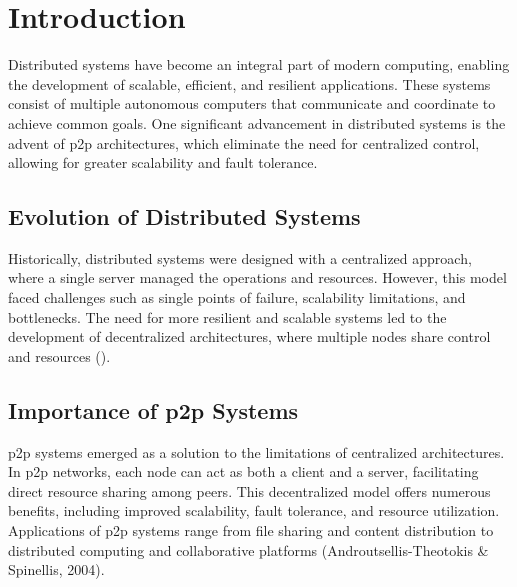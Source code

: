 \chapter{Introduction}\label{chap:intro}

Distributed systems have become an integral part of modern computing, enabling the development of scalable, efficient, and resilient applications.
These systems consist of multiple autonomous computers that communicate and coordinate to achieve common goals.
One significant advancement in distributed systems is the advent of \gls{p2p} architectures, which eliminate the need for centralized control, allowing for greater scalability and fault tolerance.

\section{Evolution of Distributed Systems}
Historically, distributed systems were designed with a centralized approach, where a single server managed the operations and resources.
However, this model faced challenges such as single points of failure, scalability limitations, and bottlenecks.
The need for more resilient and scalable systems led to the development of decentralized architectures, where multiple nodes share control and resources (\cite{distributed-systems}).

\section{Importance of \gls{p2p} Systems}

\gls{p2p} systems emerged as a solution to the limitations of centralized architectures.
In \gls{p2p} networks, each node can act as both a client and a server, facilitating direct resource sharing among peers.
This decentralized model offers numerous benefits, including improved scalability, fault tolerance, and resource utilization.
Applications of \gls{p2p} systems range from file sharing and content distribution to distributed computing and collaborative platforms (Androutsellis-Theotokis \& Spinellis, 2004).